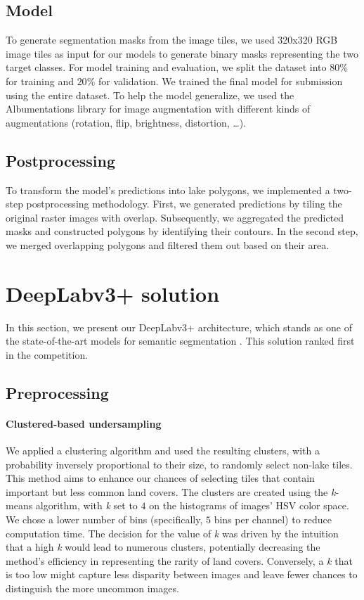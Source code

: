 \documentclass[sigconf]{acmart}
\begin{document}
\subsection{Model}
To generate segmentation masks from the image tiles, we used 320x320 RGB image tiles as input for our models to generate binary masks representing the two target classes.
For model training and evaluation, we split the dataset into $80\%$ for training and $20\%$ for validation. 
We trained the final model for submission using the entire dataset.
To help the model generalize, we used the Albumentations\cite{info11020125} library for image augmentation with different kinds of augmentations (rotation, flip, brightness, distortion, \dots).

\subsection{Postprocessing}
To transform the model's predictions into lake polygons, we implemented a two-step postprocessing methodology.
First, we generated predictions by tiling the original raster images with overlap. Subsequently, we aggregated the predicted masks and constructed polygons by identifying their contours.
In the second step, we merged overlapping polygons and filtered them out based on their area.

\section{DeepLabv3+ solution}
\label{deeplabv3}

In this section, we present our DeepLabv3+\cite{chen2018encoderdecoder} architecture, which stands as one of the state-of-the-art models for semantic segmentation \cite{sotasemanticsegmentation}. This solution ranked first in the competition.

\subsection{Preprocessing}

\paragraph{Clustered-based undersampling} We applied a clustering algorithm and used the resulting clusters, with a probability inversely proportional to their size, to randomly select non-lake tiles. This method aims to enhance our chances of selecting tiles that contain important but less common land covers.
The clusters are created using the \textit{k}-means algorithm, with \textit{k} set to $4$ on the histograms of images' HSV color space. We chose a lower number of bins (specifically, $5$ bins per channel) to reduce computation time. The decision for the value of \textit{k} was driven by the intuition that a high \textit{k} would lead to numerous clusters, potentially decreasing the method's efficiency in representing the rarity of land covers. Conversely, a \textit{k} that is too low might capture less disparity between images and leave fewer chances to distinguish the more uncommon images.
\end{document}
